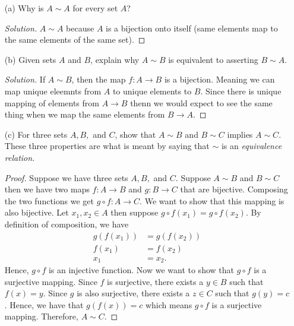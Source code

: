 \begin{enumerate}
    \item[(a)] Why is \( A \sim A \) for every set \( A \)? 
    \begin{proof}[Solution]
    \( A \sim A \) because \( A \) is a bijection onto itself (same elements map to the same elements of the same set). 
    \end{proof}
    \item[(b)] Given sets \( A \) and \( B \), explain why \( A \sim B \) is equivalent to asserting \( B \sim A \).
    \begin{proof}[Solution]
    If \( A \sim B \), then the map \( f: A \to B \) is a bijection. Meaning we can map unique eleemnts from \( A \) to unique elements to \( B \). Since there is unique mapping of elements from \( A \to B \) thenn we would expect to see the same thing when we map the same elements from \( B \to A \). 
    \end{proof}
    \item[(c)] For three sets \( A, B, \) and \( C \), show that \( A \sim B \) and \( B \sim C \) implies \( A \sim C \). These three properties are what is meant by saying that \( \sim \) is an \textit{equivalence relation}.
    \begin{proof}
     Suppose we have three sets \( A, B, \) and \( C \). Suppose \( A \sim B \) and \( B \sim C \)
     then we have two maps \( f: A \to B \) and \( g: B \to C \) that are bijective. Composing the two functions we get \( g \circ f : A \to C \). We want to show that this mapping is also bijective. Let \( x_1, x_2 \in A \) then suppose \( g \circ f (x_1) = g \circ f (x_2) \). By definition of composition, we have 
     \begin{align*}
     g(f(x_1))&= g(f(x_2)) \\
     f(x_1) &= f(x_2)  \tag{ \( g \) is injective } \\ 
     x_1 &= x_2.       \tag{ \( f \) is injective }
     \end{align*}
     Hence, \( g \circ f \) is an injective function. Now we want to show that \( g \circ f \) is a surjective mapping. Since \( f \) is surjective, there exists a \( y \in B \) such that \( f(x) = y \). Since \( g \) is also surjective, there exists a \( z \in C \) such that \( g(y) = c\). Hence, we have that \( g(f(x)) = c \) which means \( g \circ f \) is a surjective mapping. Therefore, \( A \sim C\).   
 \end{proof}




\end{enumerate}
